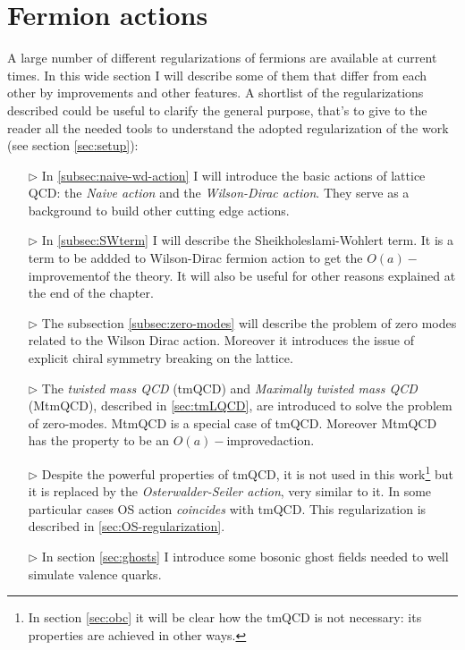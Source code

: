 \documentclass[english, LaM, oneside, noexaminfo]{sapthesis}
\newcommand{\oaid}{$O(a)-$improved}
\newcommand{\oait}{$O(a)-$improvement}
\begin{document}
\section{Fermion actions}\label{sec:fermion-discretization}
\noindent
A large number of different regularizations of fermions are available at current times.
In this wide section I will describe some of them that differ from each other by improvements and other features.
A shortlist of the regularizations described could be useful to clarify the general purpose, that's to give to the reader all the needed tools to understand the adopted regularization of the work (see section \ref{sec:setup}):
\begin{itemize}
    \item [$\triangleright$] In \ref{subsec:naive-wd-action} I will introduce the basic actions of lattice QCD: the \textit{Naive action} and the \textit{Wilson-Dirac action}.
        They serve as a background to build other cutting edge actions.
    \item [$\triangleright$] In \ref{subsec:SWterm} I will describe the Sheikholeslami-Wohlert term.
        It is a term to be addded to Wilson-Dirac fermion action to get the \oait\space of the theory.
        It will also be useful for other reasons explained at the end of the chapter.
    \item [$\triangleright$] The subsection \ref{subsec:zero-modes} will describe the problem of zero modes related to the Wilson Dirac action.
        Moreover it introduces the issue of explicit chiral symmetry breaking on the lattice.
    \item [$\triangleright$] The \textit{twisted mass QCD} (tmQCD) and \textit{Maximally twisted mass QCD} (MtmQCD), described in \ref{sec:tmLQCD}, are introduced to solve the problem of zero-modes.
        MtmQCD is a special case of tmQCD. Moreover MtmQCD has the property to be an \oaid\space action.
    \item [$\triangleright$] Despite the powerful properties of tmQCD, it is not used in this work\footnote{In section \ref{sec:obc} it will be clear how the tmQCD is not necessary: its properties are achieved in other ways.} but it is replaced by the \textit{Osterwalder-Seiler action}, very similar to it.
        In some particular cases OS action \textit{coincides} with tmQCD.
        This regularization is described in \ref{sec:OS-regularization}.
    \item [$\triangleright$] In section \ref{sec:ghosts} I introduce some bosonic ghost fields needed to well simulate valence quarks.
\end{itemize}
\end{document}
